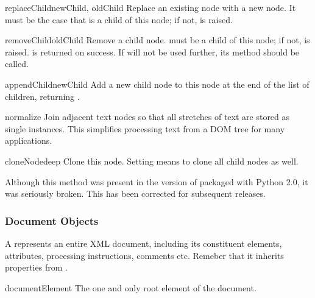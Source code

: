 \begin{methoddesc}[Node]{replaceChild}{newChild, oldChild}
Replace an existing node with a new node. It must be the case that 
 is a child of this node; if not,
 is raised.
\end{methoddesc}

\begin{methoddesc}[Node]{removeChild}{oldChild}
Remove a child node.   must be a child of this node; if
not,  is raised.   is returned on
success.  If  will not be used further, its
 method should be called.
\end{methoddesc}

\begin{methoddesc}[Node]{appendChild}{newChild}
Add a new child node to this node at the end of the list of children,
returning .
\end{methoddesc}

\begin{methoddesc}[Node]{normalize}{}
Join adjacent text nodes so that all stretches of text are stored as
single  instances.  This simplifies processing text from a
DOM tree for many applications.
\end{methoddesc}

\begin{methoddesc}[Node]{cloneNode}{deep}
Clone this node.  Setting  means to clone all child nodes as
well.

  Although this method was present in the version of
 packaged with Python 2.0, it was seriously
broken.  This has been corrected for subsequent releases.
\end{methoddesc}


\subsubsection{Document Objects \label{dom-document-objects}}

A  represents an entire XML document, including its
constituent elements, attributes, processing instructions, comments
etc.  Remeber that it inherits properties from .

\begin{memberdesc}[Document]{documentElement}
The one and only root element of the document.
\end{memberdesc}

